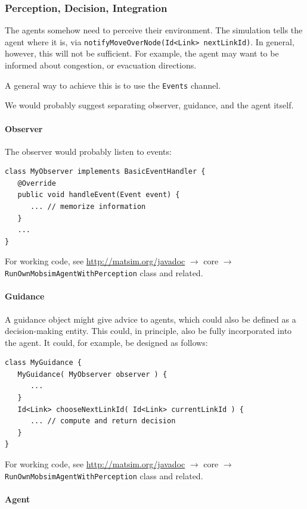 \subsubsection{Perception, Decision, Integration}
The agents somehow need to perceive their environment. The simulation tells the agent where it is, via \lstinline|notifyMoveOverNode(Id<Link> nextLinkId)|. In general, however, this will not be sufficient. For example, the agent may want to be informed about congestion, or evacuation directions.

A general way to achieve this is to use the \lstinline$Events$ channel.

We would probably suggest separating observer, guidance, and the agent itself.

\paragraph{Observer}

The observer would probably listen to events:
\begin{lstlisting}
class MyObserver implements BasicEventHandler {
   @Override
   public void handleEvent(Event event) {
      ... // memorize information
   }
   ...
}
\end{lstlisting}
For working code, see \url{http://matsim.org/javadoc} $\to$ core $\to$ \lstinline{RunOwnMobsimAgentWithPerception} class and related.

\paragraph{Guidance}

A guidance object might give advice to agents, which could also be defined as a decision-making entity. This could, in principle, also be fully incorporated into the agent. It could, for example, be designed as follows:
\begin{lstlisting}
class MyGuidance {
   MyGuidance( MyObserver observer ) {
      ...
   }
   Id<Link> chooseNextLinkId( Id<Link> currentLinkId ) {
      ... // compute and return decision
   }
}
\end{lstlisting}
For working code, see \url{http://matsim.org/javadoc} $\to$ core $\to$ \lstinline{RunOwnMobsimAgentWithPerception} class and related.

\paragraph{Agent}

